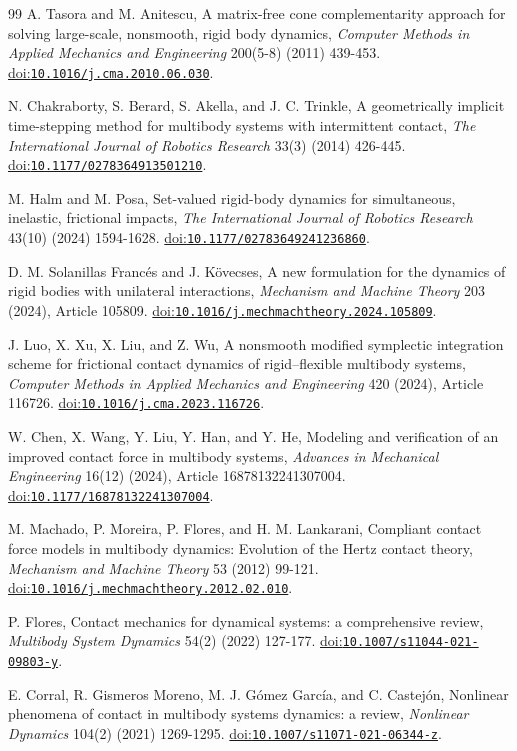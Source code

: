 \documentclass[preprint,12pt]{elsarticle}
\newcommand{\doi}[1]{\href{https://doi.org/#1}{doi:\nolinkurl{#1}}}
\begin{document}
\begin{thebibliography}{99}
A. Tasora and M. Anitescu, A matrix-free cone complementarity approach for solving large-scale, nonsmooth, rigid body dynamics, \emph{Computer Methods in Applied Mechanics and Engineering} 200(5-8) (2011) 439-453. \doi{10.1016/j.cma.2010.06.030}.

N. Chakraborty, S. Berard, S. Akella, and J. C. Trinkle, A geometrically implicit time-stepping method for multibody systems with intermittent contact, \emph{The International Journal of Robotics Research} 33(3) (2014) 426-445. \doi{10.1177/0278364913501210}.

M. Halm and M. Posa, Set-valued rigid-body dynamics for simultaneous, inelastic, frictional impacts, \emph{The International Journal of Robotics Research} 43(10) (2024) 1594-1628. \doi{10.1177/02783649241236860}.

D. M. Solanillas Franc\'{e}s and J. K\"{o}vecses, A new formulation for the dynamics of rigid bodies with unilateral interactions, \emph{Mechanism and Machine Theory} 203 (2024), Article 105809. \doi{10.1016/j.mechmachtheory.2024.105809}.

J. Luo, X. Xu, X. Liu, and Z. Wu, A nonsmooth modified symplectic integration scheme for frictional contact dynamics of rigid--flexible multibody systems, \emph{Computer Methods in Applied Mechanics and Engineering} 420 (2024), Article 116726. \doi{10.1016/j.cma.2023.116726}.

W. Chen, X. Wang, Y. Liu, Y. Han, and Y. He, Modeling and verification of an improved contact force in multibody systems, \emph{Advances in Mechanical Engineering} 16(12) (2024), Article 16878132241307004. \doi{10.1177/16878132241307004}.

M. Machado, P. Moreira, P. Flores, and H. M. Lankarani, Compliant contact force models in multibody dynamics: Evolution of the Hertz contact theory, \emph{Mechanism and Machine Theory} 53 (2012) 99-121. \doi{10.1016/j.mechmachtheory.2012.02.010}.

P. Flores, Contact mechanics for dynamical systems: a comprehensive review, \emph{Multibody System Dynamics} 54(2) (2022) 127-177. \doi{10.1007/s11044-021-09803-y}.

E. Corral, R. Gismeros Moreno, M. J. G\'{o}mez Garc\'{i}a, and C. Castej\'{o}n, Nonlinear phenomena of contact in multibody systems dynamics: a review, \emph{Nonlinear Dynamics} 104(2) (2021) 1269-1295. \doi{10.1007/s11071-021-06344-z}.


\end{thebibliography}
\end{document}
